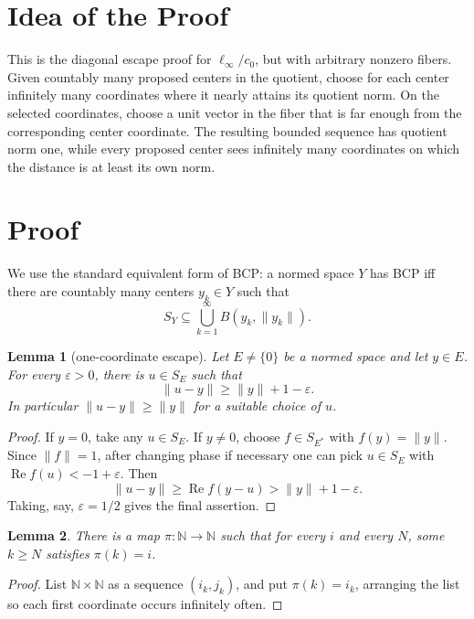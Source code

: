 \documentclass[11pt]{article}
\newtheorem{lemma}{Lemma}
\begin{document}
\section*{Idea of the Proof}

This is the diagonal escape proof for \(\ell_\infty/c_0\), but with arbitrary
nonzero fibers.  Given countably many proposed centers in the quotient, choose
for each center infinitely many coordinates where it nearly attains its
quotient norm.  On the selected coordinates, choose a unit vector in the fiber
that is far enough from the corresponding center coordinate.  The resulting
bounded sequence has quotient norm one, while every proposed center sees
infinitely many coordinates on which the distance is at least its own norm.

\section*{Proof}

We use the standard equivalent form of BCP: a normed space \(Y\) has BCP iff
there are countably many centers \(y_k\in Y\) such that
\[
        S_Y\subseteq \bigcup_{k=1}^\infty B(y_k,\|y_k\|).
\]

\begin{lemma}[one-coordinate escape]
\label{lem:one-coordinate}
Let \(E\ne\{0\}\) be a normed space and let \(y\in E\).  For every
\(\varepsilon>0\), there is \(u\in S_E\) such that
\[
        \|u-y\|\ge \|y\|+1-\varepsilon.
\]
In particular \(\|u-y\|\ge \|y\|\) for a suitable choice of \(u\).
\end{lemma}

\begin{proof}
If \(y=0\), take any \(u\in S_E\).  If \(y\ne0\), choose \(f\in S_{E^*}\) with
\(f(y)=\|y\|\).  Since \(\|f\|=1\), after changing phase if necessary one can
pick \(u\in S_E\) with \(\operatorname{Re} f(u)<-1+\varepsilon\).
Then
\[
        \|u-y\|\ge \operatorname{Re} f(y-u)>\|y\|+1-\varepsilon.
\]
Taking, say, \(\varepsilon=1/2\) gives the final assertion.
\end{proof}

\begin{lemma}
\label{lem:repeat-map}
There is a map \(\pi:\mathbb N\to\mathbb N\) such that for every \(i\) and
every \(N\), some \(k\ge N\) satisfies \(\pi(k)=i\).
\end{lemma}

\begin{proof}
List \(\mathbb N\times\mathbb N\) as a sequence \((i_k,j_k)\), and put
\(\pi(k)=i_k\), arranging the list so each first coordinate occurs infinitely
often.
\end{proof}
\end{document}
